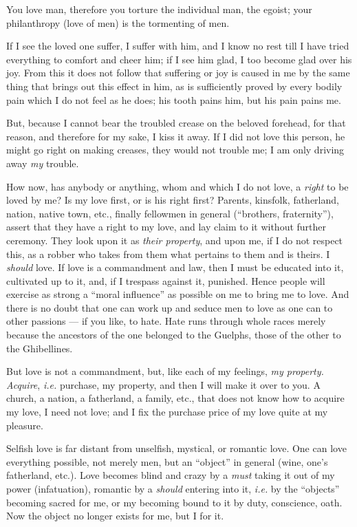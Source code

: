 You love man, therefore you torture the individual man, the egoist; your 
philanthropy (love of men) is the tormenting of men.

If I see the loved one suffer, I suffer with him, and I know no rest till I 
have tried everything to comfort and cheer him; if I see him glad, I too 
become glad over his joy. From this it does not follow that suffering or joy 
is caused in me by the same thing that brings out this effect in him, as is 
sufficiently proved by every bodily pain which I do not feel as he does; his 
tooth pains him, but his pain pains me.

But, because I cannot bear the troubled crease on the beloved forehead, for 
that reason, and therefore for my sake, I kiss it away. If I did not love this 
person, he might go right on making creases, they would not trouble me; I am 
only driving away \textit{my} trouble.

How now, has anybody or anything, whom and which I do not love, a 
\textit{right} to be loved by me? Is my love first, or is his right first? 
Parents, kinsfolk, fatherland, nation, native town, etc., finally fellowmen in 
general (``brothers, fraternity''), assert that they have a right to my 
love, and lay claim to it without further ceremony. They look upon it as 
\textit{their property}, and upon me, if I do not respect this, as a robber 
who takes from them what pertains to them and is theirs. I \textit{should} 
love. If love is a commandment and law, then I must be educated into it, 
cultivated up to it, and, if I trespass against it, punished. Hence people 
will exercise as strong a ``moral influence'' as possible on me to bring me 
to love. And there is no doubt that one can work up and seduce men to love as 
one can to other passions --- if you like, to hate. Hate runs through whole 
races merely because the ancestors of the one belonged to the Guelphs, those 
of the other to the Ghibellines.

But love is not a commandment, but, like each of my feelings, \textit{my 
property. Acquire}, \textit{i.e.} purchase, my property, and then I will make 
it over to you. A church, a nation, a fatherland, a family, etc., that does 
not know how to acquire my love, I need not love; and I fix the purchase price 
of my love quite at my pleasure.

Selfish love is far distant from unselfish, mystical, or romantic love. One 
can love everything possible, not merely men, but an ``object'' in general 
(wine, one's fatherland, etc.). Love becomes blind and crazy by a 
\textit{must} taking it out of my power (infatuation), romantic by a 
\textit{should} entering into it, \textit{i.e.} by the ``objects'' becoming 
sacred for me, or my becoming bound to it by duty, conscience, oath. Now the 
object no longer exists for me, but I for it.

